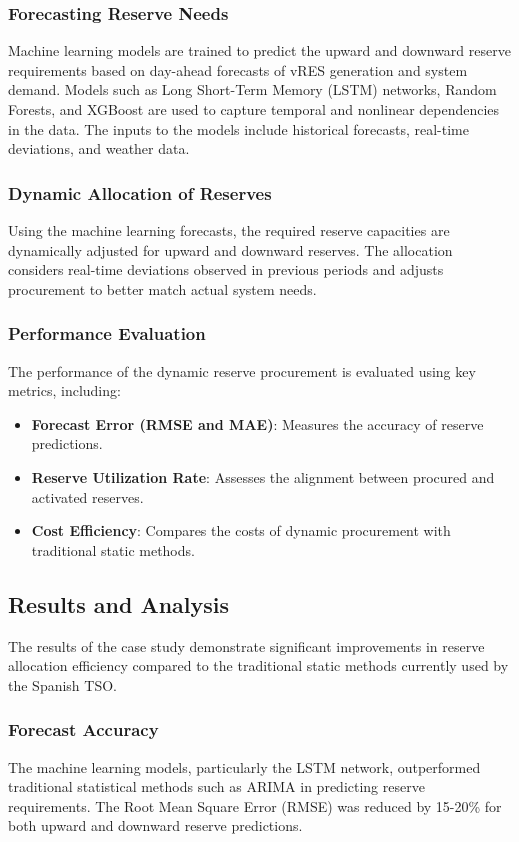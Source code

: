 \subsubsection*{Forecasting Reserve Needs}
Machine learning models are trained to predict the upward and downward reserve requirements based on day-ahead forecasts of vRES generation and system demand. Models such as Long Short-Term Memory (LSTM) networks, Random Forests, and XGBoost are used to capture temporal and nonlinear dependencies in the data. The inputs to the models include historical forecasts, real-time deviations, and weather data.

\subsubsection*{Dynamic Allocation of Reserves}
Using the machine learning forecasts, the required reserve capacities are dynamically adjusted for upward and downward reserves. The allocation considers real-time deviations observed in previous periods and adjusts procurement to better match actual system needs.

\subsubsection*{Performance Evaluation}
The performance of the dynamic reserve procurement is evaluated using key metrics, including:
\begin{itemize}
    \item \textbf{Forecast Error (RMSE and MAE)}: Measures the accuracy of reserve predictions.
    \item \textbf{Reserve Utilization Rate}: Assesses the alignment between procured and activated reserves.
    \item \textbf{Cost Efficiency}: Compares the costs of dynamic procurement with traditional static methods.
\end{itemize}

\subsection*{Results and Analysis}
The results of the case study demonstrate significant improvements in reserve allocation efficiency compared to the traditional static methods currently used by the Spanish TSO.

\subsubsection*{Forecast Accuracy}
The machine learning models, particularly the LSTM network, outperformed traditional statistical methods such as ARIMA in predicting reserve requirements. The Root Mean Square Error (RMSE) was reduced by 15-20\% for both upward and downward reserve predictions.

